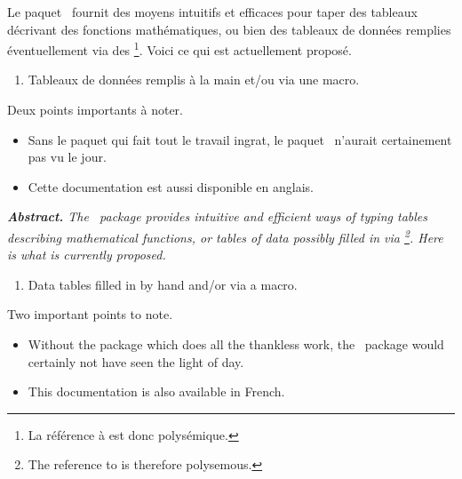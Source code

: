 \documentclass[10pt, a4paper]{article}
\begin{document}
\noindent
Le paquet \thispack\ fournit des moyens intuitifs et efficaces pour taper des tableaux décrivant des fonctions mathématiques, ou bien des tableaux de données remplies éventuellement via des 
\footnote{
	La référence à  est donc polysémique.
}.
Voici ce qui est actuellement proposé.
\begin{enumerate}
	\item Tableaux de données remplis à la main et/ou via une macro.

%
%
\end{enumerate}

\medskip

\noindent
Deux points importants à noter.
\begin{itemize}
    \item Sans le paquet  qui fait tout le travail ingrat, le paquet \thispack\ n'aurait certainement pas vu le jour.

    \item Cette documentation est aussi disponible en anglais.
\end{itemize}




\tdocsep

{\noindent
\small\itshape
\textbf{Abstract.}
The \thispack\ package provides intuitive and efficient ways of typing tables describing mathematical functions, or tables of data possibly filled in via 
\footnote{
	The reference to  is therefore polysemous.
}.
Here is what is currently proposed.
\begin{enumerate}
	\item Data tables filled in by hand and/or via a macro.

%
%
\end{enumerate}

\medskip

\noindent
Two important points to note.
\begin{itemize}
    \item Without the  package which does all the thankless work, the \thispack\ package would certainly not have seen the light of day.

    \item This documentation is also available in French.
\end{itemize}
}
\end{document}
